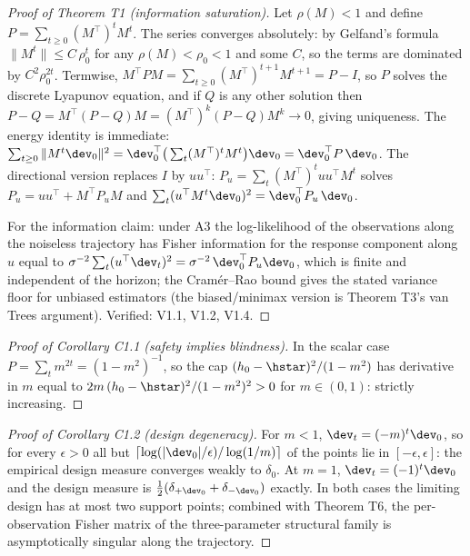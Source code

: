\begin{proof}[Proof of Theorem T1 (information saturation)]
Let $\rho(M) < 1$ and define $P = \sum_{t\ge 0} (M^\top)^t M^t$. The series
converges absolutely: by Gelfand's formula $\|M^t\| \le C\,\rho_0^t$ for any
$\rho(M) < \rho_0 < 1$ and some $C$, so the terms are dominated by
$C^2\rho_0^{2t}$. Termwise,
$M^\top P M = \sum_{t \ge 0} (M^\top)^{t+1}M^{t+1} = P - I$, so $P$ solves
the discrete Lyapunov equation, and if $Q$ is any other solution then
$P - Q = M^\top (P-Q) M = (M^\top)^k (P-Q) M^k \to 0$, giving uniqueness.
The energy identity is immediate:
$\sum_{t\ge 0} \|M^t \dev_0\|^2 = \dev_0^\top \big(\sum_t (M^\top)^t M^t\big)
\dev_0 = \dev_0^\top P\,\dev_0$. The directional version replaces $I$ by
$uu^\top$: $P_u = \sum_t (M^\top)^t uu^\top M^t$ solves
$P_u = uu^\top + M^\top P_u M$ and
$\sum_t (u^\top M^t \dev_0)^2 = \dev_0^\top P_u\,\dev_0$.

For the information claim: under A3 the log-likelihood of the observations
along the noiseless trajectory has Fisher information for the response
component along $u$ equal to $\sigma^{-2}\sum_t (u^\top \dev_t)^2 =
\sigma^{-2}\,\dev_0^\top P_u \dev_0$, which is finite and independent of the
horizon; the Cram\'er--Rao bound gives the stated variance floor for
unbiased estimators (the biased/minimax version is Theorem T3's van Trees
argument). Verified: V1.1, V1.2, V1.4.
\end{proof}

\begin{proof}[Proof of Corollary C1.1 (safety implies blindness)]
In the scalar case $P = \sum_t m^{2t} = (1-m^2)^{-1}$, so the cap
$(h_0-\hstar)^2/(1-m^2)$ has derivative in $m$ equal to
$2m\,(h_0-\hstar)^2/(1-m^2)^2 > 0$ for $m \in (0,1)$: strictly increasing.
\end{proof}

\begin{proof}[Proof of Corollary C1.2 (design degeneracy)]
For $m < 1$, $\dev_t = (-m)^t \dev_0$, so for every $\epsilon > 0$ all but
$\lceil \log(|\dev_0|/\epsilon)/\log(1/m)\rceil$ of the points lie in
$[-\epsilon, \epsilon]$: the empirical design measure converges weakly to
$\delta_0$. At $m = 1$, $\dev_t = (-1)^t \dev_0$ and the design measure is
$\tfrac{1}{2}(\delta_{+\dev_0} + \delta_{-\dev_0})$ exactly. In both cases
the limiting design has at most two support points; combined with Theorem
T6, the per-observation Fisher matrix of the three-parameter structural
family is asymptotically singular along the trajectory.
\end{proof}


